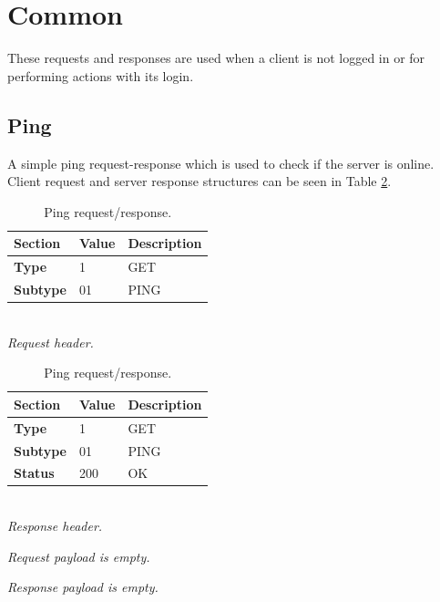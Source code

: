 \documentclass[english, sem, kiv, he, iso690alph, pdf, viewonly]{fasthesis}
\begin{document}
\section{Common}
These requests and responses are used when a client is not logged in or for performing actions with its login.

\subsection{Ping}
A simple ping request-response which is used to check if the server is online. Client request and server response structures can be seen in Table \ref{tab:ping_request_response}.

\begin{table}[h]
	\centering
	\begin{minipage}[b]{0.45\textwidth}
		\centering
		\begin{tabular}{|l|l|l|}
			\hline
			\textbf{Section} & \textbf{Value} & \textbf{Description} \\ \hline
			\textbf{Type} & 1 & \footnotesize{GET} \\ \hline
			\textbf{Subtype} & 01 & \footnotesize{PING} \\ \hline
		\end{tabular} \\
		\textit{Request header.}
	\end{minipage} 
	\hfill
	\begin{minipage}[b]{0.45\textwidth}
		\centering
		\begin{tabular}{|l|l|l|}
			\hline
			\textbf{Section} & \textbf{Value} & \textbf{Description} \\ \hline
			\textbf{Type} & 1 & \footnotesize{GET} \\ \hline
			\textbf{Subtype} & 01 & \footnotesize{PING} \\ \hline
			\textbf{Status} & 200 & \footnotesize{OK} \\ \hline
		\end{tabular} \\
		\textit{Response header.}
	\end{minipage} \newline

	\begin{minipage}[b]{0.45\textwidth}
		\centering
		\textit{Request payload is empty.}
	\end{minipage}	
	\hfill
	\begin{minipage}[b]{0.45\textwidth}
		\centering
		\textit{Response payload is empty.}
	\end{minipage}	
	\caption{Ping request/response.}
	\label{tab:ping_request_response}
\end{table}
\end{document}
